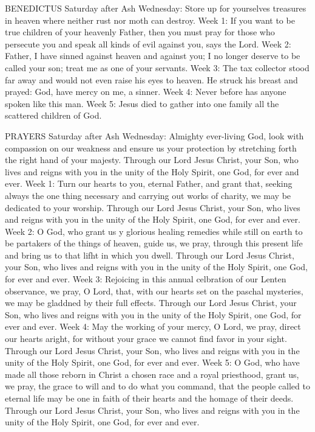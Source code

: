 BENEDICTUS
Saturday after Ash Wednesday:	Store up for yourselves treasures in heaven where neither rust nor moth can destroy.
Week 1:	If you want to be true children of your heavenly Father, then you must pray for those who persecute you and speak all kinds of evil against you, says the Lord.
Week 2:	Father, I have sinned against heaven and against you; I no longer deserve to be called your son; treat me as one of your servants.
Week 3:	The tax collector stood far away and would not even raise his eyes to heaven. He struck his breast and prayed: God, have mercy on me, a sinner.
Week 4:	Never before has anyone spoken like this man.
Week 5:	Jesus died to gather into one family all the scattered children of God.

PRAYERS
Saturday after Ash Wednesday:	Almighty ever-living God, look with compassion on our weakness and ensure us your protection by stretching forth the right hand of your majesty. Through our Lord Jesus Christ, your Son, who lives and reigns with you in the unity of the Holy Spirit, one God, for ever and ever.
Week 1:	Turn our hearts to you, eternal Father, and grant that, seeking always the one thing necessary and carrying out works of charity, we may be dedicated to your worship. Through our Lord Jesus Christ, your Son, who lives and reigns with you in the unity of the Holy Spirit, one God, for ever and ever.
Week 2:	O God, who grant us y glorious healing remedies while still on earth to be partakers of the things of heaven, guide us, we pray, through this present life and bring us to that lifht in which you dwell. Through our Lord Jesus Christ, your Son, who lives and reigns with you in the unity of the Holy Spirit, one God, for ever and ever.
Week 3:	Rejoicing in this annual celbration of our Lenten observance, we pray, O Lord, that, with our hearts set on the paschal mysteries, we may be gladdned by their full effects. Through our Lord Jesus Christ, your Son, who lives and reigns with you in the unity of the Holy Spirit, one God, for ever and ever.
Week 4:	May the working of your mercy, O Lord, we pray, direct our hearts aright, for without your grace we cannot find favor in your sight. Through our Lord Jesus Christ, your Son, who lives and reigns with you in the unity of the Holy Spirit, one God, for ever and ever.
Week 5:	O God, who have made all those reborn in Christ a chosen race and a royal priesthood, grant us, we pray, the grace to will and to do what you command, that the people called to eternal life may be one in faith of their hearts and the homage of their deeds. Through our Lord Jesus Christ, your Son, who lives and reigns with you in the unity of the Holy Spirit, one God, for ever and ever.

